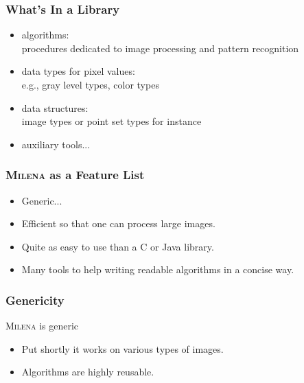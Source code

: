 \documentclass{beamer}
\newcommand{\mln}{\textsc{Milena}\xspace}
\begin{document}
\begin{frame}%
  \frametitle{What's In a Library}

  \begin{itemize}
  \item algorithms:\\
    procedures dedicated to image processing and pattern recognition
    \smallskip
  \item data types for pixel values:\\
    e.g., gray level types, color types
    \smallskip
  \item data structures:\\
    image types or point set types for instance
    \smallskip
  \item auxiliary tools...
  \end{itemize}

\end{frame}


\begin{frame}
  \frametitle{\mln as a Feature List}

  \begin{itemize}
  \item Generic...
  \item Efficient so that one can process large images.
  \item Quite as easy to use than a C or Java library.
  \item Many tools to help writing readable algorithms in a concise way.
  \end{itemize}

\end{frame}


\begin{frame}
  \frametitle{Genericity}

  \begin{block}{\mln is generic}
    \begin{itemize}
    \item Put shortly it works on various types of images.
    \item Algorithms are highly reusable.
    \end{itemize}
  \end{block}


\end{frame}
\end{document}
